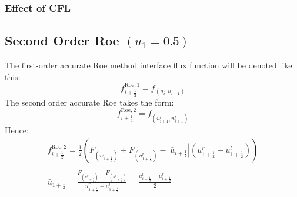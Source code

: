 \documentclass[11pt, a4paper]{article}
\begin{document}

\subsubsection{Effect of CFL}


\subsection{Second Order Roe $(u_1 = 0.5)$}
The first-order accurate Roe method interface flux function will be denoted like this:
\begin{equation*}
    f_{i+\frac{1}{2}}^{\mathrm{Roe},1}=f_{\left(u_i, u_{i+1}\right)}
\end{equation*}
The second order accurate Roe takes the form:
\begin{equation*}
    f_{i+\frac{1}{2}}^{\mathrm{Roe},2}=f_{\left(u_{i+1}^l, u_{i+1}^r\right)}
\end{equation*}
Hence:
\begin{equation}
    \begin{matrix}
        \displaystyle f_{i+\frac{1}{2}}^{\mathrm{Roe},2}=\frac{1}{2}\left(F_{\left(u_{1+\frac{1}{2}}^l\right)}+F_{\left(u_{1+\frac{1}{2}}^r\right)}-\left|\bar{u}_{i+\frac{1}{2}}\right|\left(u_{1+\frac{1}{2}}^r-u_{1+\frac{1}{2}}^l\right)\right) \\\\
        \displaystyle \bar{u}_{1+\frac{1}{2}}=\frac{F_{\left(u_{1+\frac{1}{2}}^r\right)}-F_{\left(u_{1+\frac{1}{2}}^l\right)}}{u_{1+\frac{1}{2}}^r-u_{1+\frac{1}{2}}^l} = \frac{u_{i+\frac{1}{2}}^l+u_{i+\frac{1}{2}}^r}{2}
    \end{matrix}
\end{equation}
\end{document}
